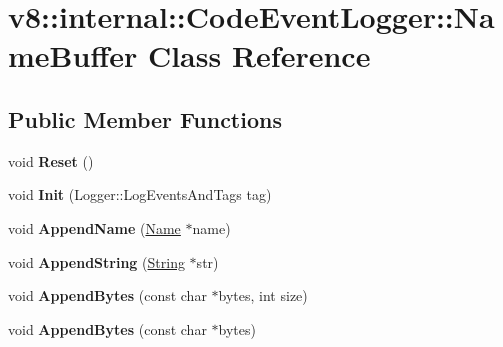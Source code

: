 \hypertarget{classv8_1_1internal_1_1_code_event_logger_1_1_name_buffer}{}\section{v8\+:\+:internal\+:\+:Code\+Event\+Logger\+:\+:Name\+Buffer Class Reference}
\label{classv8_1_1internal_1_1_code_event_logger_1_1_name_buffer}
\subsection*{Public Member Functions}
\begin{DoxyCompactItemize}
\item 
void {\bfseries Reset} ()\hypertarget{classv8_1_1internal_1_1_code_event_logger_1_1_name_buffer_a2f4816566d8394a82560375ccea82bfa}{}\label{classv8_1_1internal_1_1_code_event_logger_1_1_name_buffer_a2f4816566d8394a82560375ccea82bfa}

\item 
void {\bfseries Init} (Logger\+::\+Log\+Events\+And\+Tags tag)\hypertarget{classv8_1_1internal_1_1_code_event_logger_1_1_name_buffer_a05b2880413af02e892ca99f7d12f1e48}{}\label{classv8_1_1internal_1_1_code_event_logger_1_1_name_buffer_a05b2880413af02e892ca99f7d12f1e48}

\item 
void {\bfseries Append\+Name} (\hyperlink{classv8_1_1internal_1_1_name}{Name} $\ast$name)\hypertarget{classv8_1_1internal_1_1_code_event_logger_1_1_name_buffer_a2d3c2d750b61f0da98193804e2a4eff6}{}\label{classv8_1_1internal_1_1_code_event_logger_1_1_name_buffer_a2d3c2d750b61f0da98193804e2a4eff6}

\item 
void {\bfseries Append\+String} (\hyperlink{classv8_1_1internal_1_1_string}{String} $\ast$str)\hypertarget{classv8_1_1internal_1_1_code_event_logger_1_1_name_buffer_acf07bc22dd108df5d7cffa753c021a5b}{}\label{classv8_1_1internal_1_1_code_event_logger_1_1_name_buffer_acf07bc22dd108df5d7cffa753c021a5b}

\item 
void {\bfseries Append\+Bytes} (const char $\ast$bytes, int size)\hypertarget{classv8_1_1internal_1_1_code_event_logger_1_1_name_buffer_afbbcc095e6a286550d3368e86bcdab2d}{}\label{classv8_1_1internal_1_1_code_event_logger_1_1_name_buffer_afbbcc095e6a286550d3368e86bcdab2d}

\item 
void {\bfseries Append\+Bytes} (const char $\ast$bytes)\hypertarget{classv8_1_1internal_1_1_code_event_logger_1_1_name_buffer_a5db4ff91339345c223d9f376f93ee4dc}{}\label{classv8_1_1internal_1_1_code_event_logger_1_1_name_buffer_a5db4ff91339345c223d9f376f93ee4dc}


\end{DoxyCompactItemize}

